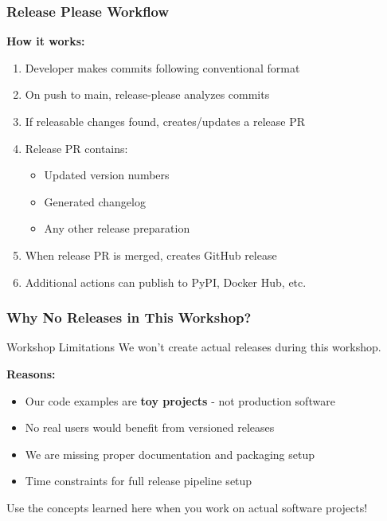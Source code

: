 \begin{frame}
	\frametitle{Release Please Workflow}
	\textbf{How it works:}
	\begin{enumerate}[<+->]
		\item Developer makes commits following conventional format
		\item On push to main, release-please analyzes commits
		\item If releasable changes found, creates/updates a release PR
		\item Release PR contains:
		\begin{itemize}
			\item Updated version numbers
			\item Generated changelog
			\item Any other release preparation
		\end{itemize}
		\item When release PR is merged, creates GitHub release
		\item Additional actions can publish to PyPI, Docker Hub, etc.
	\end{enumerate}
\end{frame}

\begin{frame}
	\frametitle{Why No Releases in This Workshop?}
	\begin{block}{Workshop Limitations}
		{We won't create actual releases during this workshop.}
	\end{block}
	\pause
	\textbf{Reasons:}
	\begin{itemize}
		\item Our code examples are \textbf{toy projects} - not production software
		\item No real users would benefit from versioned releases
		\item We are missing proper documentation and packaging setup
		\item Time constraints for full release pipeline setup
	\end{itemize}
	\pause
	\begin{hint}
		{Use the concepts learned here when you work on actual software projects!}
	\end{hint}
\end{frame}

